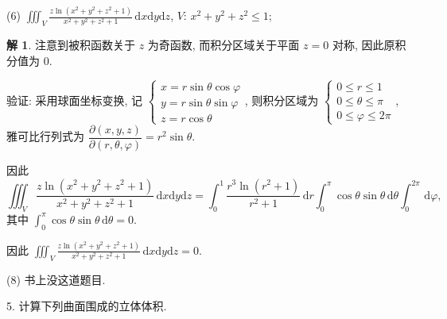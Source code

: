 \documentclass[a4paper,12pt]{article}
\theoremstyle{definition}
\newtheorem*{sol}{解}
\begin{document}
(6) $\displaystyle\iiint_V \frac{z \ln(x^2+y^2+z^2+1)}{x^2+y^2+z^2+1} \, \mathrm{d}x\mathrm{d}y\mathrm{d}z$, $V$: $x^2+y^2+z^2 \leq 1$;
\begin{sol}
    注意到被积函数关于 $z$ 为奇函数, 而积分区域关于平面 $z=0$ 对称, 因此原积分值为 $0$.

    验证: 采用球面坐标变换, 记 $\begin{cases}
            x=r\sin\theta\cos\varphi \\
            y=r\sin\theta\sin\varphi \\
            z=r\cos\theta
        \end{cases}$, 则积分区域为 $\begin{cases}
            0\leq r\leq 1        \\
            0\leq \theta\leq \pi \\
            0\leq \varphi\leq 2\pi
        \end{cases}$, 雅可比行列式为 $\dfrac{\partial(x,y,z)}{\partial(r,\theta,\varphi)}=r^2\sin\theta$.

    因此
    $$\iiint_V \frac{z \ln(x^2+y^2+z^2+1)}{x^2+y^2+z^2+1} \, \mathrm{d}x\mathrm{d}y\mathrm{d}z=\int_0^1\frac{r^3\ln(r^2+1)}{r^2+1}\,\mathrm{d}r\int_0^{\pi}\cos\theta\sin\theta\,\mathrm{d}\theta\int_0^{2\pi} \,\mathrm{d}\varphi,$$
    其中 $\displaystyle\int_0^{\pi}\cos\theta\sin\theta\,\mathrm{d}\theta=0$.

    因此 $\displaystyle\iiint_V \frac{z \ln(x^2+y^2+z^2+1)}{x^2+y^2+z^2+1} \, \mathrm{d}x\mathrm{d}y\mathrm{d}z=0$.
\end{sol}
(8) 书上没这道题目.



5. 计算下列曲面围成的立体体积.
\end{document}
